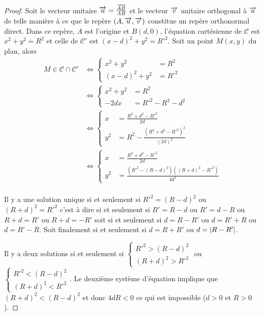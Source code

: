\begin{proof}
  Soit le vecteur unitaire \(\overrightarrow{u} = \frac{\overrightarrow{AB}}{AB}\) et le vecteur
  \(\overrightarrow{v}\) unitaire orthogonal à \(\overrightarrow{u}\) de telle manière à ce que le repère
  \((A, \overrightarrow{u}, \overrightarrow{v})\) constitue un repère orthonormal direct. Dans ce
  repère, \(A\) est l'origine et \(B(d, 0)\), l'équation cartésienne de
  \(\mathcal{C}\) est \(x^2 + y^2 = R^2\) et celle de \(\mathcal{C}'\) est
  \((x - d)^2 + y^2 = R'^2\). Soit un point \(M(x, y)\) du plan, alors
  \begin{align}
    M \in \mathcal{C} \cap \mathcal{C}'
      &\iff
      \begin{cases}
        x^2 + y^2 &= R^2 \\ (x - d)^2 + y^2 &= R'^2
      \end{cases}\\
      &\iff
      \begin{cases}
        x^2 + y^2 &= R^2 \\ -2dx &= R'^2 - R^2 - d^2
      \end{cases}\\
      &\iff
      \begin{cases}
        x &= \frac{R^2 + d^2 - R'^2}{2d} \\
        y^2 &= R^2 - \frac{(R^2 + d^2 - R'^2)^2}{(2d)^2}
      \end{cases}\\
      &\iff
      \begin{cases}
        x &= \frac{R^2 + d^2 - R'^2}{2d} \\
        y^2 &= \frac{(R'^2 - (R - d)^2)((R + d)^2 - R'^2)}{4d^2}
      \end{cases}\\
  \end{align}

  Il y a une solution unique si et seulement si \(R'^2 = (R - d)^2\) ou
  \((R + d)^2 = R'^2\) c'est à dire si et seulement si \(R' = R - d\) ou
  \(R' = d - R\) ou \(R + d = R'\) ou \(R + d = -R'\) soit si et seulement
  si \(d = R - R'\) ou \(d = R' + R\) ou \(d = R' - R\). Soit finalement si
  et seulement si \(d = R + R'\) ou \(d = \left\lvert R - R'\right\rvert\).

  Il y a deux solutions si et seulement si \(
  \begin{cases}
    R'^2 > (R - d)^2 \\
    (R + d)^2>R'^2
  \end{cases}
  \) ou \(
  \begin{cases}
    R'^2 < (R - d)^2 \\
    (R + d)^2<R'^2
  \end{cases}
  \).
  Le deuxième système d'équation implique que \((R + d)^2<(R - d)^2\) et
  donc \(4dR<0\) ce qui est impossible (\(d>0\) et \(R>0\)).


\end{proof}

